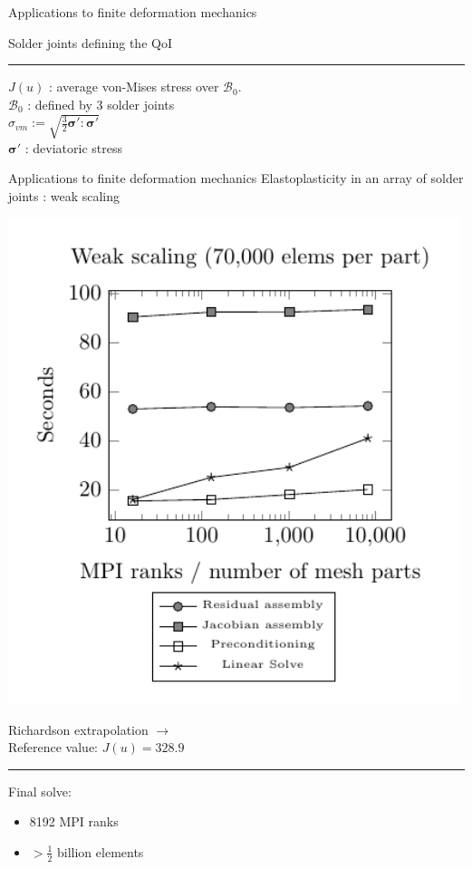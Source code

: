 \documentclass[fleqn]{beamer}
\newcommand{\bs}[1]{\boldsymbol{#1}}
\begin{document}
\begin{frame}{Applications to finite deformation mechanics}
\begin{minipage}{0.5\textwidth}
\begin{figure}
\end{figure}
Solder joints defining the QoI
\hrule
\vspace{1em}
$J(u)$ : average von-Mises stress over $\mathcal{B}_0$. \\
$\mathcal{B}_0$ : defined by 3 solder joints \\
$\sigma_{vm} := \sqrt{\frac32 \bs{\sigma}' : \bs{\sigma}'}$ \\
$\bs{\sigma}'$ : deviatoric stress
\end{minipage}
\end{frame}


\begin{frame}{Applications to finite deformation mechanics}
{Elastoplasticity in an array of solder joints : weak scaling}
\begin{minipage}{0.5\textwidth}
\centering
\includegraphics[width=0.99\textwidth]{../img/aut_weak_scaling}
\end{minipage}%
\begin{minipage}{0.5\textwidth}
Richardson extrapolation $\rightarrow$ \\
Reference value: $J(u) = 328.9$ \\
\vspace{0.5em}
\hrule
\vspace{1em}
Final solve:
\begin{itemize}
\item 8192 MPI ranks
\item $> \frac12$ billion elements
\end{itemize}
\end{minipage}
\end{frame}
\end{document}
